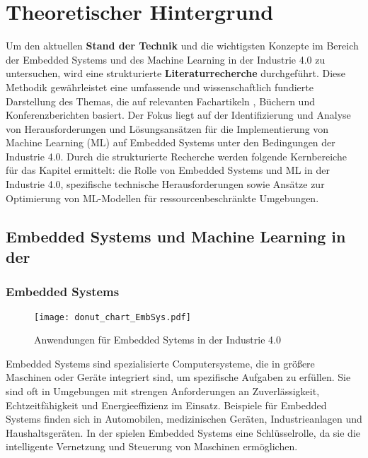 \chapter{Theoretischer Hintergrund}
\label{chap:theoretische_hintergrund}

Um den aktuellen \textbf{Stand der Technik} und die wichtigsten Konzepte im Bereich der Embedded Systems und des 
Machine Learning in der Industrie 4.0 zu untersuchen, wird eine strukturierte \textbf{Literaturrecherche} durchgeführt. 
Diese Methodik gewährleistet eine umfassende und wissenschaftlich fundierte Darstellung des Themas, die auf relevanten 
Fachartikeln \cite{10087221}, Büchern \cite{Soldatos2024} und Konferenzberichten \cite{8119409} basiert. Der Fokus liegt 
auf der Identifizierung und Analyse von Herausforderungen und Lösungsansätzen für die Implementierung von Machine Learning (ML) 
auf Embedded Systems unter den Bedingungen der Industrie 4.0. Durch die strukturierte Recherche werden folgende Kernbereiche 
für das Kapitel ermittelt: die Rolle von Embedded Systems und ML in der Industrie 4.0, spezifische technische Herausforderungen 
sowie Ansätze zur Optimierung von ML-Modellen für ressourcenbeschränkte Umgebungen.


\section{Embedded Systems und Machine Learning in der \Iviernull}

\subsection{Embedded Systems}
\begin{figure}[h]
    \centering
    \texttt{[image: donut\_chart\_EmbSys.pdf]}
    \caption{Anwendungen für Embedded Sytems in der Industrie 4.0} 
    \label{fig:donut_chart_EmbSys}
\end{figure}
Embedded Systems sind spezialisierte Computersysteme, die in größere Maschinen oder Geräte integriert sind,
um spezifische Aufgaben zu erfüllen. Sie sind oft in Umgebungen mit strengen Anforderungen an Zuverlässigkeit, 
Echtzeitfähigkeit und Energieeffizienz im Einsatz. Beispiele für Embedded Systems finden sich in Automobilen, 
medizinischen Geräten, Industrieanlagen und Haushaltsgeräten. In der \Iviernull spielen Embedded Systems eine Schlüsselrolle, 
da sie die intelligente Vernetzung und Steuerung von Maschinen ermöglichen. 

\subsection{\Iviernull}

